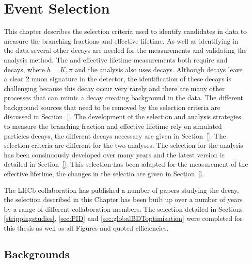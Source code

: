 \chapter{Event Selection}
\label{selection_chapter}

This chapter describes the selection criteria used to identify \bmumu candidates in data to measure the \bmumu branching fractions and \bsmumu effective lifetime. As well as identifying \bmumu in the data several other decays are needed for the measurements and validating the analysis method. The \BF and effective lifetime measurements both require \bsjpsiphi and \bhh decays, where $h = K, \pi$ and the \BF analysis also uses \bujpsik decays.  Although \bsmumu decays leave a clear 2 muon signature in the detector, the identification of these decays is challenging because this decay occur very rarely and there are many other processes that can mimic a \bmumu decay creating background in the data. The different background sources that need to be removed by the selection criteria are discussed in Section~\ref{}. The development of the selection and analysis strategies to measure the \bmumu branching fraction and \bsmumu effective lifetime rely on simulated particles decays, the different decays necessary are given in Section~\ref{}. 
The selection criteria are different for the two analyses. The selection for the \bmumu \BF analysis has been consinuously developed over many years and the latest version is detailed in Section~\ref{}. This selection has been adapted for the measurement of the \bsmumu effective lifetime, the changes in the selectio are given in Section~\ref{}.


The LHCb collaboration has published a number of papers studying the \bsmumu decay, the selection described in this Chapter has been built up over a number of years by a range of different collaboration members. The selection detailed in Sections \ref{strippingstudies}, \ref{sec:PID} and \ref{sec:globalBDToptimisation} were completed for this thesis as well as all Figures and quoted efficiencies.

\section{Backgrounds}
\label{sec:backgroundoutline}

